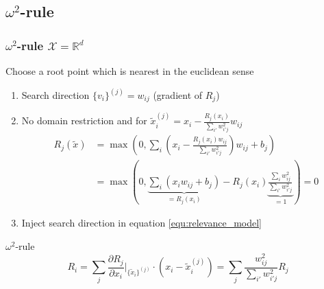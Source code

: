 \documentclass{beamer}
\begin{document}
\subsection[$\omega^2$-rule]{$\omega^2$-rule}


\begin{frame}
\frametitle{$\omega^2$-rule $\mathcal{X}=\mathbb{R}^d$}
\vspace{0.35cm}
Choose a root point which is nearest in the euclidean sense\\

\begin{enumerate}
	\item Search direction $\{v_i\}^{(j)} = w_{ij}$ (gradient of $R_j$)
	\item No domain restriction and for $\tilde{x}_i^{(j)} = x_i - \frac{R_j(x_i)}{\sum_{i'}w_{i'j}^2} w_{ij}$
	\begin{align*}
		R_j(\tilde{x}) &= \max(0, \sum_i (x_i -\frac{R_j(x_i) w_{ij}}{\sum_{i'}w_{i'j}^2}) w_{ij}  + b_j) \\
		&= \max(0, \underbrace{\sum_i (x_i w_{ij} + b_j)}_{=R_j(x_i)} - R_j (x_i) \underbrace{\frac{\sum_{i}w_{ij}^2}{\sum_{i'}w_{i'j}^2}}_{=1} )= 0 
	\end{align*}
	\vspace{-0.1cm}
	\item Inject search direction in equation \eqref{equ:relevance_model}
\end{enumerate}

\pause
\vspace{-0.15cm}
\begin{block}{$\omega^2$-rule}
\begin{equation*}
R_i =\sum_j\frac{\partial R_j}{\partial x_i}\Big|_{\{\tilde{x}_i\}^{(j)}} \cdot (x_i - \tilde{x}_i^{(j)}) =  \sum_j\frac{w_{ij}^2}{\sum_{i'} w_{i'j}^2} R_j
\end{equation*}
\end{block}



\end{frame}
\end{document}
